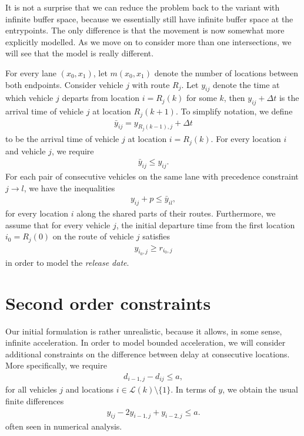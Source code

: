 \documentclass{article}
\theoremstyle{definition}
\theoremstyle{plain}
\begin{document}
It is not a surprise that we can reduce the problem back to the variant with
infinite buffer space, because we essentially still have infinite buffer space
at the entrypoints. The only difference is that the movement is now somewhat
more explicitly modelled. As we move on to consider more than one intersections,
we will see that the model is really different.

{\color{gray} For every lane $(x_{0}, x_{1})$, let $m(x_{0}, x_{1})$ denote the
  number of locations between both endpoints. Consider vehicle $j$ with route
  $R_{j}$. Let $y_{ij}$ denote the time at which vehicle $j$ departs from
  location $i = R_{j}(k)$ for some $k$, then $y_{ij} + \Delta t$ is the arrival
  time of vehicle $j$ at location $R_{j}(k+1)$. To simplify notation, we define
\begin{align}
  \bar{y}_{ij} = y_{R_{j}(k-1),j} + \Delta t
\end{align}
to be the arrival time of vehicle $j$ at location $i = R_{j}(k)$. For every
location $i$ and vehicle $j$, we require
\begin{align}
  \bar{y}_{ij} \leq y_{ij} .
\end{align}
For each pair of consecutive vehicles on the same lane
with precedence constraint $j \rightarrow l$, we have the inequalities
\begin{align}
  y_{ij} + p \leq \bar{y}_{il} ,
\end{align}
for every location $i$ along the shared parts of their routes. Furthermore, we
assume that for every vehicle $j$, the initial departure time from the first
location $i_{0} = R_{j}(0)$ on the route of vehicle $j$ satisfies
\begin{align}
  \label{eq:release}
  y_{i_{0},j} \geq r_{i_{0},j}
\end{align}
in order to model the \textit{release date}.
}


\section{Second order constraints}

Our initial formulation is rather unrealistic, because it allows, in some sense,
infinite acceleration. In order to model bounded acceleration, we will consider
additional constraints on the difference between delay at consecutive locations.
More specifically, we require
\begin{align*}
  d_{i-1,j} - d_{ij} \leq a ,
\end{align*}
for all vehicles $j$ and locations $i \in \mathcal{L}(k) \setminus \{ 1 \}$.
In terms of $y$, we obtain the usual finite differences
\begin{align*}
  y_{ij} - 2 y_{i-1,j} + y_{i-2,j} \leq a .
\end{align*}
often seen in numerical analysis.


% 
% 
\end{document}
